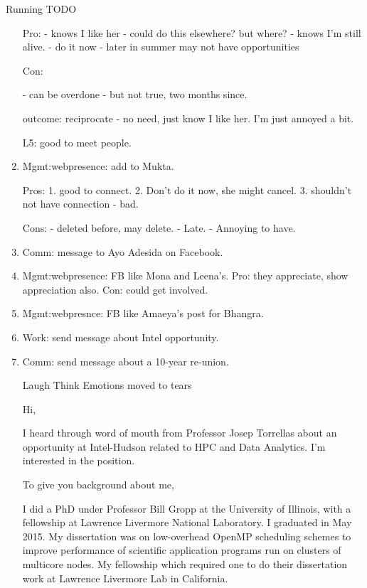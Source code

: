 \documentclass[serif, mathserif, final]{beamer}
\begin{document}
\begin{frame}
\begin{columns}
\begin{column}{0.50\linewidth}
\begin{block}{Running TODO}
\begin{enumerate}
          Pro: 
          - knows I like her - could do this elsewhere? but
          where? 
          - knows I'm still alive. 
          - do it now - later in summer may not have opportunities

         
          Con: 

          - can be overdone - but not true, two months since. 
          
          outcome: reciprocate - no need, just know I like her. I'm
          just annoyed a bit. 

          L5: good to meet people.  
          

        \item \tiny Mgmt:webpresence: add to Mukta.

          Pros: 
          1. good to connect. 
          2. Don't do it now, she might cancel.
          3. shouldn't not have connection - bad. 

          Cons: 
          -  deleted before, may delete. 
          -  Late. 
          -  Annoying to have.           

        \item \tiny Comm: message to Ayo Adesida on Facebook. 
          

        \item \tiny Mgmt:webpresence: FB like Mona and Leena's. Pro:
          they appreciate, show appreciation also. Con: could get
          involved. 

        \item \tiny Mgmt:webpresnce: FB like Amaeya's post for
          Bhangra.  



        \item \tiny Work: send message about Intel opportunity. 

        \item \tiny  Comm: send message about a 10-year re-union.


Laugh 
Think 
Emotions moved to tears 



Hi,

I heard through word of mouth from Professor Josep Torrellas about
an opportunity at Intel-Hudson related to HPC and Data Analytics. I'm
interested in the position.

To give you background about me, 

I did a PhD under Professor Bill Gropp at the University of Illinois,
with a fellowship at Lawrence Livermore National Laboratory. I
graduated in May 2015. My dissertation was on low-overhead OpenMP scheduling schemes to
improve performance of scientific application programs run on clusters
of multicore nodes. My fellowship which required one to do their
dissertation work at Lawrence Livermore Lab in California. 


\end{enumerate}
\end{block}
\end{column}
\end{columns}
\end{frame}
\end{document}
